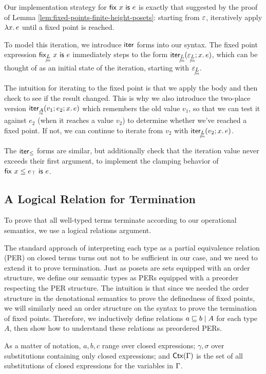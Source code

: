 Our implementation strategy for $\fix{x}{e}$ is exactly that suggested by the
proof of Lemma \ref{lem:fixed-points-finite-height-posets}: starting from
$\unit$, iteratively apply $\fn\bind{x} e$ until a fixed point is
reached.

To model this iteration, we introduce $\ms{iter}$ forms into our
syntax.  The fixed point expression $\tfix{\fineq{L}}{x}{e}$
immediately steps to the form
$\iter{\fineq{L}}{\unit_{\fineq{L}}}{x}{e}$, which can be thought of
as an initial state of the iteration, starting with $\unit_{\fineq{L}}$.

The intuition for iterating to the fixed point is that we apply the 
body and then check to see if the result changed. This is why we also 
introduce the two-place version $\iterstep{\eq{A}}{v_1}{e_2}{x}{e}$ 
which remembers the old value $v_1$, so that we can test it against $e_2$ (when it
reaches a value $v_2$) to determine
whether we've reached a fixed point. If not, we can continue to iterate from
$v_2$ with $\iter{\fineq{L}}{v_2}{x}{e}$. 

The $\ms{iter}_\le$ forms are similar, but additionally check that the iteration
value never exceeds their first argument, to implement the clamping behavior of
$\fixle{x}{e_\top}{e}$.


\subsection{A Logical Relation for Termination}

To prove that all well-typed terms terminate according to our operational
semantics, we use a logical relations argument.

The standard approach of interpreting each type as a partial equivalence
relation (PER) on closed terms turns out not to be sufficient in our case, and
we need to extend it to prove termination. Just as posets are sets equipped with
an order structure, we define our semantic types as PERs equipped with a
preorder respecting the PER structure. The intuition is that since we needed the
order structure in the denotational semantics to prove the definedness of fixed
points, we will similarly need an order structure on the syntax to prove the
termination of fixed points. Therefore, we inductively define relations
$\lr{A}{a \ale b}$ for each type $A$, then show how to understand these
relations as preordered PERs.

As a matter of notation, $a,b,c$ range over closed expressions; $\gamma, \sigma$
over substitutions containing only closed expressions; and $\ms{Ctx}(\GG)$ is
the set of all substitutions of closed expressions for the variables in $\GG$.

